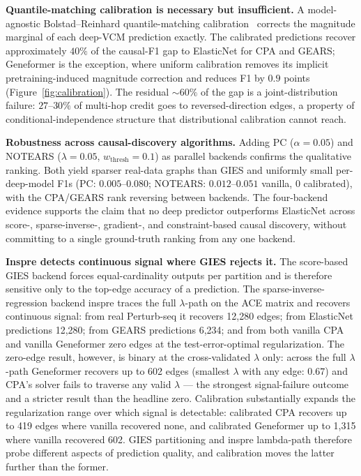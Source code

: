 \documentclass{article}
\begin{document}
\textbf{Quantile-matching calibration is necessary but insufficient.} A model-agnostic Bolstad--Reinhard quantile-matching calibration~\citep{bolstad2003,reinhard2001} corrects the magnitude marginal of each deep-VCM prediction exactly. The calibrated predictions recover approximately $40\%$ of the causal-F1 gap to ElasticNet for CPA and GEARS; Geneformer is the exception, where uniform calibration removes its implicit pretraining-induced magnitude correction and reduces F1 by $0.9$ points (Figure~\ref{fig:calibration}). The residual $\sim\!60\%$ of the gap is a joint-distribution failure: $27$--$30\%$ of multi-hop credit goes to reversed-direction edges, a property of conditional-independence structure that distributional calibration cannot reach.

\textbf{Robustness across causal-discovery algorithms.} Adding PC ($\alpha = 0.05$) and NOTEARS ($\lambda = 0.05$, $w_{\text{thresh}} = 0.1$) as parallel backends confirms the qualitative ranking. Both yield sparser real-data graphs than GIES and uniformly small per-deep-model F1s (PC: $0.005$--$0.080$; NOTEARS: $0.012$--$0.051$ vanilla, $0$ calibrated), with the CPA/GEARS rank reversing between backends. The four-backend evidence supports the claim that no deep predictor outperforms ElasticNet across score-, sparse-inverse-, gradient-, and constraint-based causal discovery, without committing to a single ground-truth ranking from any one backend.

\textbf{Inspre detects continuous signal where GIES rejects it.} The score-based GIES backend forces equal-cardinality outputs per partition and is therefore sensitive only to the top-edge accuracy of a prediction. The sparse-inverse-regression backend inspre traces the full $\lambda$-path on the ACE matrix and recovers continuous signal: from real Perturb-seq it recovers 12{,}280 edges; from ElasticNet predictions 12{,}280; from GEARS predictions 6{,}234; and from both vanilla CPA and vanilla Geneformer zero edges at the test-error-optimal regularization. The zero-edge result, however, is binary at the cross-validated $\lambda$ only: across the full $\lambda$-path Geneformer recovers up to 602 edges (smallest $\lambda$ with any edge: $0.67$) and CPA's solver fails to traverse any valid $\lambda$ --- the strongest signal-failure outcome and a stricter result than the headline zero. Calibration substantially expands the regularization range over which signal is detectable: calibrated CPA recovers up to 419 edges where vanilla recovered none, and calibrated Geneformer up to 1{,}315 where vanilla recovered 602. GIES partitioning and inspre lambda-path therefore probe different aspects of prediction quality, and calibration moves the latter further than the former.
\end{document}
